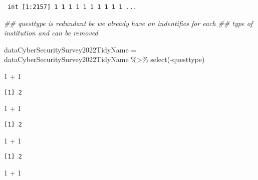 \documentclass[
  a4paper,
  DIV=11,
  numbers=noendperiod]{scrartcl}
\newenvironment{Shaded}{\begin{snugshade}}{\end{snugshade}}
\newcommand{\DecValTok}[1]{\textcolor[rgb]{0.68,0.00,0.00}{#1}}
\newcommand{\DocumentationTok}[1]{\textcolor[rgb]{0.37,0.37,0.37}{\textit{#1}}}
\newcommand{\FunctionTok}[1]{\textcolor[rgb]{0.28,0.35,0.67}{#1}}
\newcommand{\NormalTok}[1]{\textcolor[rgb]{0.00,0.23,0.31}{#1}}
\newcommand{\OtherTok}[1]{\textcolor[rgb]{0.00,0.23,0.31}{#1}}
\newcommand{\SpecialCharTok}[1]{\textcolor[rgb]{0.37,0.37,0.37}{#1}}
\begin{document}
\begin{verbatim}
 int [1:2157] 1 1 1 1 1 1 1 1 1 1 ...
\end{verbatim}

\begin{Shaded}
\begin{Highlighting}[]
\DocumentationTok{\#\# questtype is redundant be we already have an indentifies for each}
\DocumentationTok{\#\# type of institution and can be removed}

\NormalTok{dataCyberSecuritySurvey2022TidyName }\OtherTok{=}\NormalTok{ dataCyberSecuritySurvey2022TidyName }\SpecialCharTok{\%\textgreater{}\%}
    \FunctionTok{select}\NormalTok{(}\SpecialCharTok{{-}}\NormalTok{questtype)}
\end{Highlighting}
\end{Shaded}

\begin{Shaded}
\begin{Highlighting}[]
\DecValTok{1} \SpecialCharTok{+} \DecValTok{1}
\end{Highlighting}
\end{Shaded}

\begin{verbatim}
[1] 2
\end{verbatim}

\begin{Shaded}
\begin{Highlighting}[]
\DecValTok{1} \SpecialCharTok{+} \DecValTok{1}
\end{Highlighting}
\end{Shaded}

\begin{verbatim}
[1] 2
\end{verbatim}

\begin{Shaded}
\begin{Highlighting}[]
\DecValTok{1} \SpecialCharTok{+} \DecValTok{1}
\end{Highlighting}
\end{Shaded}

\begin{verbatim}
[1] 2
\end{verbatim}

\begin{Shaded}
\begin{Highlighting}[]
\DecValTok{1} \SpecialCharTok{+} \DecValTok{1}
\end{Highlighting}
\end{Shaded}
\end{document}
